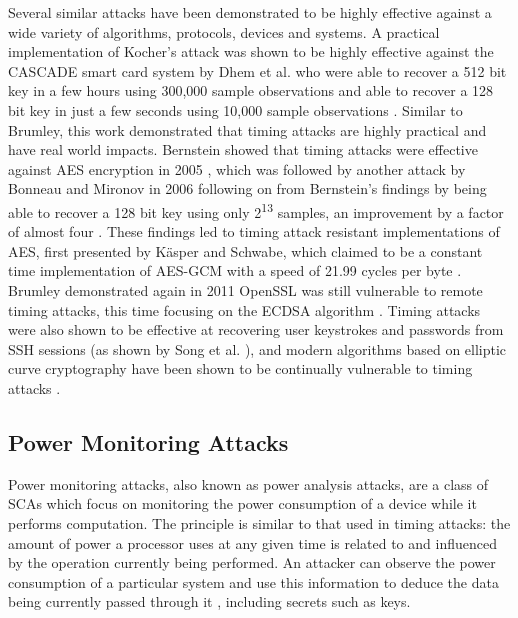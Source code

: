 \documentclass[a4paper,oneside,11pt]{article}
\begin{document}
Several similar attacks have been demonstrated to be highly effective against a
wide variety of algorithms, protocols, devices and systems. A practical
implementation of Kocher's attack was shown to be highly effective against the
CASCADE smart card system by Dhem et al. who were able to recover a 512 bit key
in a few hours using 300,000 sample observations and able to recover a 128 bit
key in just a few seconds using 10,000 sample observations
\cite{A/Dhem-2000-Timing-Practical}. Similar to Brumley, this work demonstrated
that timing attacks are highly practical and have real world impacts. Bernstein
showed that timing attacks were effective against AES encryption in 2005
\cite{A/Bernstein-2005-Timing-AES}, which was followed by another attack by
Bonneau and Mironov in 2006 following on from Bernstein's findings by being
able to recover a 128 bit key using only 2\textsuperscript{13} samples, an
improvement by a factor of almost four \cite{A/Bonneau-2006-Timing-AES}. These
findings led to timing attack resistant implementations of AES, first presented
by K{\"a}sper and Schwabe, which claimed to be a constant time implementation
of AES-GCM with a speed of 21.99 cycles per byte
\cite{A/Kasper-2009-Timing-AES}.  Brumley demonstrated again in 2011 OpenSSL
was still vulnerable to remote timing attacks, this time focusing on the ECDSA
algorithm \cite{A/Brumley-2011-Remote-TAs}. Timing attacks were also shown to
be effective at recovering user keystrokes and passwords from SSH sessions (as
shown by Song et al. \cite{A/Song-2001-Timing-SSH}), and modern algorithms
based on elliptic curve cryptography have been shown to be continually
vulnerable to timing attacks \cite{A/Jancar-2020-Minerva}.



\subsection{Power Monitoring Attacks}
\label{sec:power-monitoring-attacks}

Power monitoring attacks, also known as power analysis attacks, are a class of
SCAs which focus on monitoring the power consumption of a device while it
performs computation. The principle is similar to that used in timing attacks:
the amount of power a processor uses at any given time is related to and
influenced by the operation currently being performed. An attacker can observe
the power consumption of a particular system and use this information to deduce
the data being currently passed through it \cite{A/Kocher-1999-DPA}, including
secrets such as keys.
\end{document}
